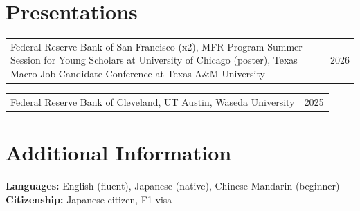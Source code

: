 \documentclass[letterpaper,11pt]{article}
\makeatletter
\newenvironment{cvsection}{%
  \begin{list}{}{\setlength{\leftmargin}{0.15in}%
    \setlength{\rightmargin}{0.10in}%
    \setlength{\topsep}{0pt}\setlength{\partopsep}{0pt}%
    \setlength{\itemsep}{0pt}\setlength{\parsep}{0pt}}\item[]
}{\end{list}}
\newcommand{\datedentry}[2]{%
  \begin{tabularx}{\linewidth}{@{}>{\raggedright\arraybackslash}X@{\hspace{12pt}}r@{}}
    #1 & #2
  \end{tabularx}\par\vspace{1pt}%
}
\makeatother
\begin{document}
\section*{Presentations}
\begin{cvsection}
  \datedentry{Federal Reserve Bank of San Francisco (x2), MFR Program Summer
    Session for Young Scholars at University of Chicago (poster), Texas Macro Job Candidate
    Conference at Texas A\&M University}{2026}
  \datedentry{Federal Reserve Bank of Cleveland, UT Austin, Waseda University}{2025}
\end{cvsection}

\section*{Additional Information}
\begin{cvsection}
  \textbf{Languages:} English (fluent), Japanese (native), Chinese-Mandarin (beginner)\\[3pt]
  \textbf{Citizenship:} Japanese citizen, F1 visa
\end{cvsection}
\end{document}
